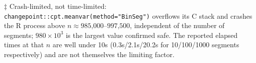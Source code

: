 \documentclass{article}
\begin{document}
\begin{table}[!ht]
$\ddagger$ Crash-limited, not time-limited: \texttt{changepoint::cpt.meanvar(method="BinSeg")} overflows its C stack and crashes the R process above $n \approx 985\text{,}000$--$997\text{,}500$, independent of the number of segments; $980 \times 10^3$ is the largest value confirmed safe. The reported elapsed times at that $n$ are well under 10s (0.3s/2.1s/20.2s for 10/100/1000 segments respectively) and are not themselves the limiting factor.

\end{table}
\end{document}
